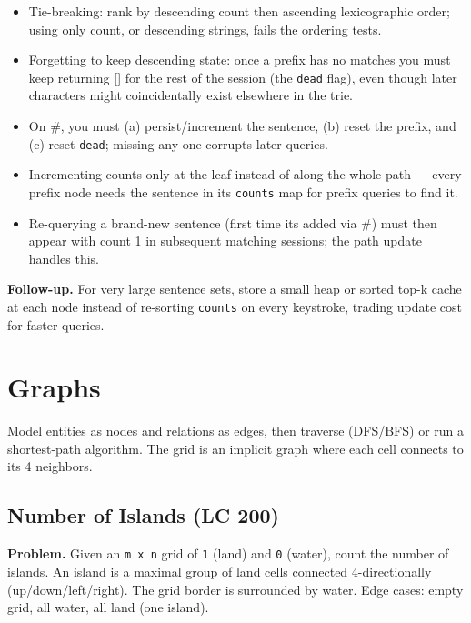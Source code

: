 \documentclass[11pt]{article}
\providecommand{\tightlist}{\setlength{\itemsep}{1pt}\setlength{\parskip}{0pt}}
\begin{document}
\begin{itemize}
\tightlist
\item
  Tie-breaking: rank by descending count then ascending lexicographic order; using only count, or descending strings, fails the ordering tests.
\item
  Forgetting to keep descending state: once a prefix has no matches you must keep returning {[}{]} for the rest of the session (the \texttt{dead} flag), even though later characters might coincidentally exist elsewhere in the trie.
\item
  On \textquotesingle\#\textquotesingle, you must (a) persist/increment the sentence, (b) reset the prefix, and (c) reset \texttt{dead}; missing any one corrupts later queries.
\item
  Incrementing counts only at the leaf instead of along the whole path --- every prefix node needs the sentence in its \texttt{counts} map for prefix queries to find it.
\item
  Re-querying a brand-new sentence (first time it\textquotesingle s added via \textquotesingle\#\textquotesingle) must then appear with count 1 in subsequent matching sessions; the path update handles this.
\end{itemize}

\textbf{Follow-up.} For very large sentence sets, store a small heap or sorted top-k cache at each node instead of re-sorting \texttt{counts} on every keystroke, trading update cost for faster queries.

\section{Graphs}\label{graphs}

Model entities as nodes and relations as edges, then traverse (DFS/BFS) or run a shortest-path algorithm. The grid is an implicit graph where each cell connects to its 4 neighbors.

\subsection{Number of Islands (LC 200)}\label{number-of-islands-lc-200}

\textbf{Problem.} Given an \texttt{m\ x\ n} grid of \texttt{\textquotesingle{}1\textquotesingle{}} (land) and \texttt{\textquotesingle{}0\textquotesingle{}} (water), count the number of islands. An island is a maximal group of land cells connected 4-directionally (up/down/left/right). The grid border is surrounded by water. Edge cases: empty grid, all water, all land (one island).
\end{document}
